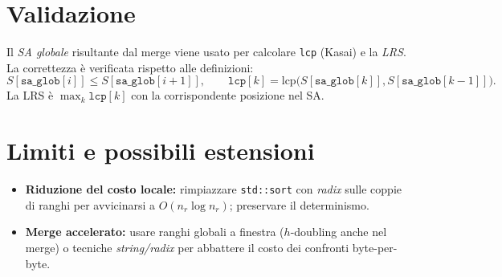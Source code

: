 	\section{Validazione}
		Il \emph{SA globale} risultante dal merge viene usato per calcolare \texttt{lcp} (Kasai) e la \textit{LRS}. La correttezza è verificata rispetto alle definizioni:
		\[
			S[\texttt{sa\_glob}[i]] \le S[\texttt{sa\_glob}[i+1]],\qquad
			\texttt{lcp}[k] = \mathrm{lcp}\big(S[\texttt{sa\_glob}[k]], S[\texttt{sa\_glob}[k-1]]\big).
		\]
		La LRS è \(\max_k \texttt{lcp}[k]\) con la corrispondente posizione nel SA\@.
	
	\section{Limiti e possibili estensioni}
		\begin{itemize}
			\item \textbf{Riduzione del costo locale:} rimpiazzare \texttt{std::sort} con \emph{radix} sulle coppie di ranghi per avvicinarsi a \(O(n_r \log n_r)\); preservare il determinismo.
			\item \textbf{Merge accelerato:} usare ranghi globali a finestra (\(h\)-doubling anche nel merge) o tecniche \emph{string/radix} per abbattere il costo dei confronti byte-per-byte.
		\end{itemize}